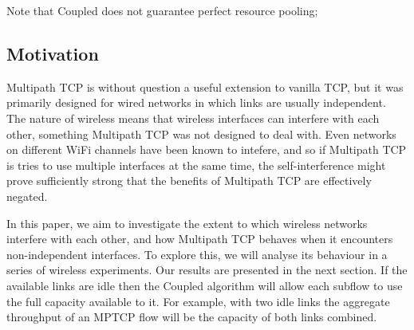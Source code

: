 Note that Coupled does not guarantee perfect resource pooling;

\subsection{Motivation}
Multipath TCP is without question a useful extension to vanilla TCP, but it was
primarily designed for wired networks in which links are usually independent.
The nature of wireless means that wireless interfaces can interfere with each
other, something Multipath TCP was not designed to deal with. Even networks on
different WiFi channels have been known to intefere, and so if Multipath TCP is
tries to use multiple interfaces at the same time, the self-interference might
prove sufficiently strong that the benefits of Multipath TCP are effectively
negated.

In this paper, we aim to investigate the extent to which wireless networks
interfere with each other, and how Multipath TCP behaves when it encounters
non-independent interfaces. To explore this, we will analyse its behaviour in a
series of wireless experiments. Our results are presented in the next section.
If the available links are idle then the Coupled algorithm will allow each
subflow to use the full capacity available to it. For example, with two idle
links the aggregate throughput of an MPTCP flow will be the capacity of both
links combined.
